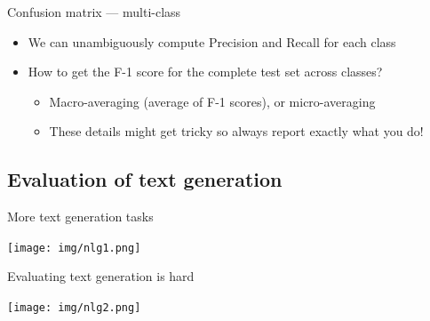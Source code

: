 \documentclass[12pt,aspectratio=169,handout]{beamer}
\begin{document}
\begin{frame}{Confusion matrix --- multi-class}

\begin{itemize}
\item We can unambiguously compute Precision and Recall for each class
\item How to get the F-1 score for the complete test set across classes?
\begin{itemize}
\item Macro-averaging (average of F-1 scores), or micro-averaging
\item These details might get tricky so always report exactly what you do!
\end{itemize}

\end{itemize}

\end{frame}















\subsection{Evaluation of text generation}


\begin{frame}{More text generation tasks}

\texttt{[image: img/nlg1.png]}


\end{frame}


\begin{frame}{Evaluating text generation is hard}
	
\texttt{[image: img/nlg2.png]}
	
\end{frame}
\end{document}
